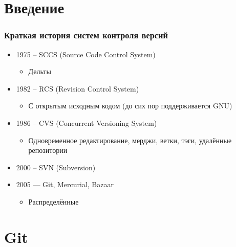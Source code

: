 \documentclass{../cscslides}
\begin{document}
    \frame{\titlepage}

    \section{Введение}

    \begin{frame}
        \frametitle{Краткая история систем контроля версий}
        \begin{itemize}
            \item 1975 -- SCCS (Source Code Control System)
            \begin{itemize}
                \item Дельты
            \end{itemize}
            \item 1982 -- RCS (Revision Control System)
            \begin{itemize}
                \item С открытым исходным кодом (до сих пор поддерживается GNU)
            \end{itemize}
            \item 1986 -- CVS (Concurrent Versioning System)
            \begin{itemize}
                \item Одновременное редактирование, мерджи, ветки, тэги, удалённые репозитории
            \end{itemize}
            \item 2000 -- SVN (Subversion)
            \item 2005 --- Git, Mercurial, Bazaar
            \begin{itemize}
                \item Распределённые
            \end{itemize}
        \end{itemize}
    \end{frame}

    \section{Git}
\end{document}
